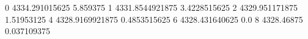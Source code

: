 0 4334.291015625 5.859375
1 4331.8544921875 3.4228515625
2 4329.951171875 1.51953125
4 4328.9169921875 0.4853515625
6 4328.431640625 0.0
8 4328.46875 0.037109375
